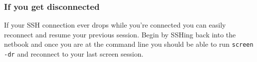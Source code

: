 \subsubsection{If you get disconnected}
If your SSH connection ever drops while you're connected you can easily
reconnect and resume your previous session. Begin by SSHing back into the
netbook and once you are at the command line you should be able to run
\texttt{screen -dr} and reconnect to your last screen session.
